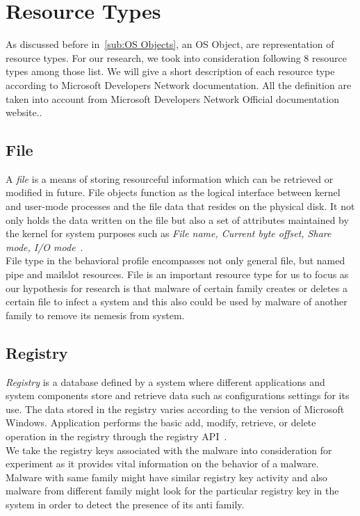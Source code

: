 \section{Resource Types}
\label{sec:Resource Types}
As discussed before in~\autoref{sub:OS Objects}, an OS Object, are representation of resource types.
For our research, we took into consideration following 8 resource types among those list.
We will give a short description of each resource type according to Microsoft Developers Network documentation.
All the definition are taken into account from Microsoft Developers Network Official documentation website.\cite[MSDN]{msdn}.
\subsection{File}
\label{sub:File}
A \emph{file} is a means of storing resourceful information which can be retrieved or modified in future.
File objects function as the logical interface between kernel and user-mode processes and the file data that resides on the physical disk.
It not only holds the data written on the file but also a set of attributes maintained by the kernel for system purposes such as \emph{File name, Current byte offset, Share mode, I/O mode}~\cite[]{msfile}.\\
File type in the behavioral profile encompasses not only general file, but named pipe and mailslot resources. File is an important resource type for us to focus as our hypothesis for research is that malware of certain family creates or deletes a certain file to infect a system and this also could be used by malware of another family to remove its nemesis from system.
\subsection{Registry}
\label{sub:Registry}
\emph{Registry} is a database defined by a system where different applications and system components store and retrieve data such as configurations settings for its use.
The data stored in the registry varies according to the version of Microsoft Windows.
Application performs the basic add, modify, retrieve, or delete operation in the registry through the registry API~\cite[]{msregistry}.\\
We take the registry keys associated with the malware into consideration for experiment as it provides vital information on the behavior of a malware. Malware with same family might have similar registry key activity and also malware from different family might look for the particular registry key in the system in order to detect the presence of its anti family.
